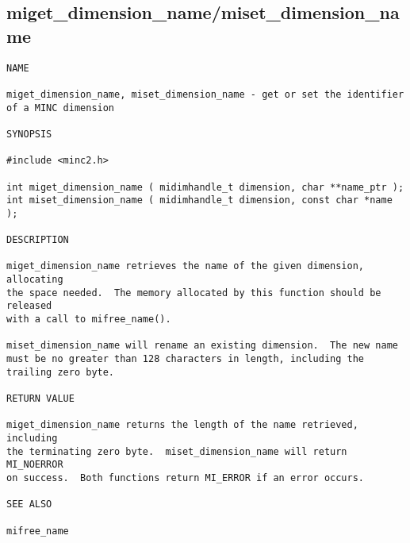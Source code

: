 \documentclass{article}
\begin{document}
\subsection{miget\_dimension\_name/miset\_dimension\_name}
\begin{verbatim}
NAME

miget_dimension_name, miset_dimension_name - get or set the identifier
of a MINC dimension

SYNOPSIS

#include <minc2.h>

int miget_dimension_name ( midimhandle_t dimension, char **name_ptr );
int miset_dimension_name ( midimhandle_t dimension, const char *name );

DESCRIPTION

miget_dimension_name retrieves the name of the given dimension, allocating
the space needed.  The memory allocated by this function should be released
with a call to mifree_name().

miset_dimension_name will rename an existing dimension.  The new name
must be no greater than 128 characters in length, including the
trailing zero byte.

RETURN VALUE

miget_dimension_name returns the length of the name retrieved, including
the terminating zero byte.  miset_dimension_name will return MI_NOERROR
on success.  Both functions return MI_ERROR if an error occurs.

SEE ALSO

mifree_name
\end{verbatim}
\end{document}
